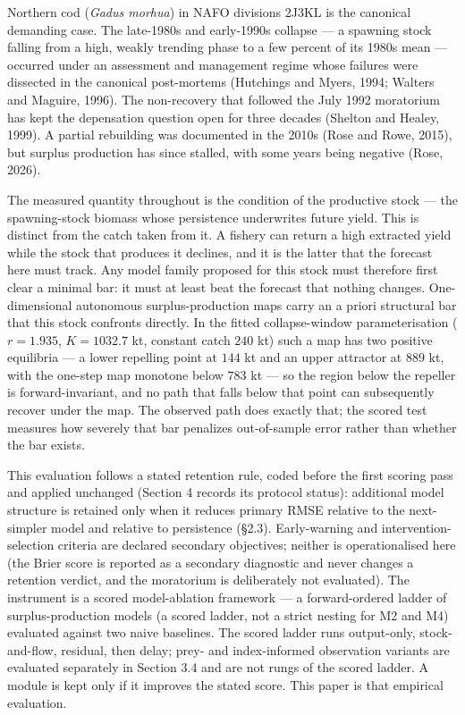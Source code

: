 \documentclass[11pt]{article}
\begin{document}
Northern cod (\emph{Gadus morhua}) in NAFO divisions 2J3KL is the
canonical demanding case. The late-1980s and early-1990s collapse --- a
spawning stock falling from a high, weakly trending phase to a few
percent of its 1980s mean --- occurred under an assessment and
management regime whose failures were dissected in the canonical
post-mortems (Hutchings and Myers, 1994; Walters and Maguire, 1996). The
non-recovery that followed the July 1992 moratorium has kept the
depensation question open for three decades (Shelton and Healey, 1999).
A partial rebuilding was documented in the 2010s (Rose and Rowe, 2015),
but surplus production has since stalled, with some years being negative
(Rose, 2026).

The measured quantity throughout is the condition of the productive
stock --- the spawning-stock biomass whose persistence underwrites
future yield. This is distinct from the catch taken from it. A fishery
can return a high extracted yield while the stock that produces it
declines, and it is the latter that the forecast here must track. Any
model family proposed for this stock must therefore first clear a
minimal bar: it must at least beat the forecast that nothing changes.
One-dimensional autonomous surplus-production maps carry an a priori
structural bar that this stock confronts directly. In the fitted
collapse-window parameterisation (\(r = 1.935\), \(K = 1032.7\) kt,
constant catch \(240\) kt) such a map has two positive equilibria --- a
lower repelling point at \(144\) kt and an upper attractor at \(889\)
kt, with the one-step map monotone below \(783\) kt --- so the region
below the repeller is forward-invariant, and no path that falls below
that point can subsequently recover under the map. The observed path
does exactly that; the scored test measures how severely that bar
penalizes out-of-sample error rather than whether the bar exists.

This evaluation follows a stated retention rule, coded before the first
scoring pass and applied unchanged (Section 4 records its protocol
status): additional model structure is retained only when it reduces
primary RMSE relative to the next-simpler model and relative to
persistence (\S{}2.3). Early-warning and intervention-selection criteria
are declared secondary objectives; neither is operationalised here (the
Brier score is reported as a secondary diagnostic and never changes a
retention verdict, and the moratorium is deliberately not evaluated).
The instrument is a scored model-ablation framework --- a
forward-ordered ladder of surplus-production models (a scored ladder,
not a strict nesting for M2 and M4) evaluated against two naive
baselines. The scored ladder runs output-only, stock-and-flow,
residual, then delay; prey- and index-informed observation variants are
evaluated separately in Section 3.4 and are not rungs of the scored
ladder. A module is kept only if it improves the stated
score. This paper is that empirical evaluation.
\end{document}
